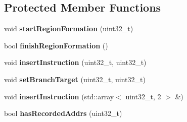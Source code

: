 \subsection*{Protected Member Functions}
\begin{DoxyCompactItemize}
\item 
void {\bfseries start\+Region\+Formation} (uint32\+\_\+t)\hypertarget{classdbt_1_1_r_f_t_a52a661cac3101446ded778953167857d}{}\label{classdbt_1_1_r_f_t_a52a661cac3101446ded778953167857d}

\item 
bool {\bfseries finish\+Region\+Formation} ()\hypertarget{classdbt_1_1_r_f_t_aacccb0531cd987fb5a7f36ecf6a3748c}{}\label{classdbt_1_1_r_f_t_aacccb0531cd987fb5a7f36ecf6a3748c}

\item 
void {\bfseries insert\+Instruction} (uint32\+\_\+t, uint32\+\_\+t)\hypertarget{classdbt_1_1_r_f_t_afa6211edc8eda4c885da61d96cda62c7}{}\label{classdbt_1_1_r_f_t_afa6211edc8eda4c885da61d96cda62c7}

\item 
void {\bfseries set\+Branch\+Target} (uint32\+\_\+t, uint32\+\_\+t)\hypertarget{classdbt_1_1_r_f_t_aba15abcd233b0aecdaa0edb0c89ead0d}{}\label{classdbt_1_1_r_f_t_aba15abcd233b0aecdaa0edb0c89ead0d}

\item 
void {\bfseries insert\+Instruction} (std\+::array$<$ uint32\+\_\+t, 2 $>$ \&)\hypertarget{classdbt_1_1_r_f_t_ab3656263cb1446b41e9d3f24481dfa24}{}\label{classdbt_1_1_r_f_t_ab3656263cb1446b41e9d3f24481dfa24}

\item 
bool {\bfseries has\+Recorded\+Addrs} (uint32\+\_\+t)\hypertarget{classdbt_1_1_r_f_t_a24370d694a70801229b9715f5b885735}{}\label{classdbt_1_1_r_f_t_a24370d694a70801229b9715f5b885735}

\end{DoxyCompactItemize}
